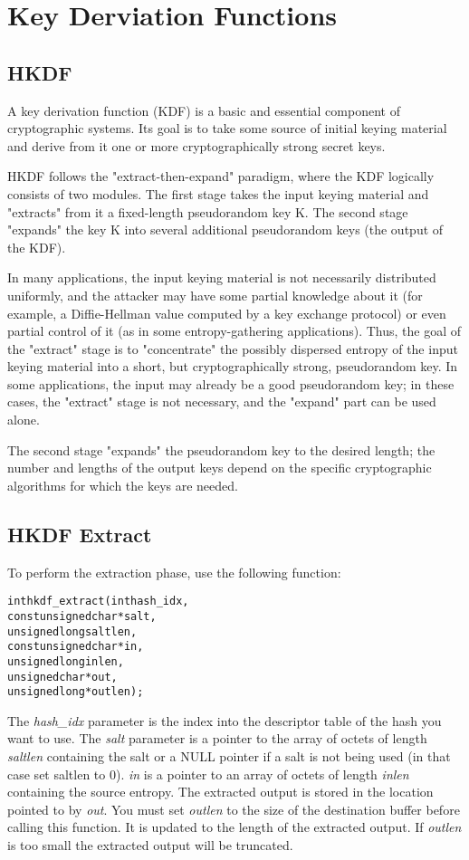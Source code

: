 \documentclass[synpaper]{book}
\newcommand{\mysection}[1]    %
	{                   %
	\section{#1}
   \markboth{\textsf{www.libtom.org}}{\thesection ~ {#1}}
	}
\begin{document}
\mysection{Key Derviation Functions}
\subsection{HKDF}
A key derivation function (KDF) is a basic and essential component of cryptographic systems.  Its goal is to take some source of initial
keying material and derive from it one or more cryptographically strong secret keys.

HKDF follows the "extract-then-expand" paradigm, where the KDF logically consists of two modules.  The first stage takes the input
keying material and "extracts" from it a fixed-length pseudorandom key K.  The second stage "expands" the key K into several additional
pseudorandom keys (the output of the KDF).

In many applications, the input keying material is not necessarily distributed uniformly, and the attacker may have some partial
knowledge about it (for example, a Diffie-Hellman value computed by a key exchange protocol) or even partial control of it (as in some
entropy-gathering applications).  Thus, the goal of the "extract" stage is to "concentrate" the possibly dispersed entropy of the input
keying material into a short, but cryptographically strong, pseudorandom key.  In some applications, the input may already be a
good pseudorandom key; in these cases, the "extract" stage is not necessary, and the "expand" part can be used alone.

The second stage "expands" the pseudorandom key to the desired length; the number and lengths of the output keys depend on the
specific cryptographic algorithms for which the keys are needed.

\subsection{HKDF Extract}
To perform the extraction phase, use the following function:

\begin{alltt}
int hkdf_extract(   int  hash_idx,
    const unsigned char *salt,
          unsigned long  saltlen,
    const unsigned char *in,
          unsigned long  inlen,
          unsigned char *out,
          unsigned long *outlen);
\end{alltt}
The \textit{hash\_idx} parameter is the index into the descriptor table of the hash you want to use.
The \textit{salt} parameter is a pointer to the array of octets of length \textit{saltlen} containing the salt or a NULL pointer if a salt is not being used (in that case set saltlen to 0).
\textit{in} is a pointer to an array of octets of length \textit{inlen} containing the source entropy.  The extracted output is stored in the location pointed to by \textit{out}.
You must set \textit{outlen} to the size of the destination buffer before calling this function. It is updated to the length of the extracted output. If \textit{outlen} is too small the extracted output will be truncated.
\end{document}
